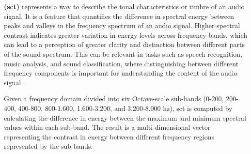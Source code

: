 


\textbf{ (\gls{sct})} represents a way to describe the tonal characteristics or timbre of an audio signal. It is a feature that quantifies the difference in spectral energy between peaks and valleys in the frequency spectrum of an audio signal. Higher spectral contrast indicates greater variation in energy levels across frequency bands, which can lead to a perception of greater clarity and distinction between different parts of the sound spectrum. This can be relevant in tasks such as speech recognition, music analysis, and sound classification, where distinguishing between different frequency components is important for understanding the content of the audio signal \cite{Jiang2002}.

Given a frequency domain divided into six Octave-scale sub-bands (0-200, 200-400, 400-800, 800-1.600, 1.600-3.200, and 3.200-8.000 \gls{hz}), \gls{sct} is computed by calculating the difference in energy between the maximum and minimum spectral values within each sub-band. The result is a multi-dimensional vector representing the contrast in energy between different frequency regions represented by the sub-bands.




